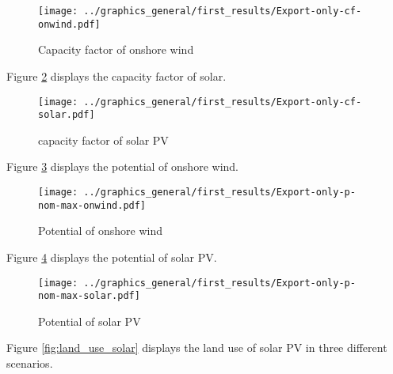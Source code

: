\begin{figure}[h!]
    \centering
    \texttt{[image: ../graphics\_general/first\_results/Export-only-cf-onwind.pdf]}
    \caption{Capacity factor of onshore wind}
    \label{fig:cf-onwind}
\end{figure}


Figure \ref{fig:cf-solar} displays the capacity factor of solar.

\begin{figure}[h!]
    \centering
    \texttt{[image: ../graphics\_general/first\_results/Export-only-cf-solar.pdf]}
    \caption{capacity factor of solar PV}
    \label{fig:cf-solar}
\end{figure}


Figure \ref{fig:p-nom-max-onwind} displays the potential of onshore wind.

\begin{figure}[h!]
    \centering
    \texttt{[image: ../graphics\_general/first\_results/Export-only-p-nom-max-onwind.pdf]}
    \caption{Potential of onshore wind}
    \label{fig:p-nom-max-onwind}
\end{figure}


Figure \ref{fig:p-nom-max-solar} displays the potential of solar PV.

\begin{figure}[h!]
    \centering
    \texttt{[image: ../graphics\_general/first\_results/Export-only-p-nom-max-solar.pdf]}
    \caption{Potential of solar PV}
    \label{fig:p-nom-max-solar}
\end{figure}


Figure \ref{fig:land_use_solar} displays the land use of solar PV in three different scenarios.

